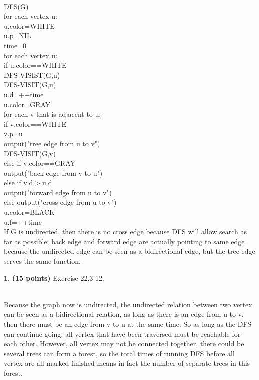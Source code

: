\documentclass[11pt]{article}
\theoremstyle{definition}
\theoremstyle{theorem}
\newtheorem{prob}{}
\newcommand{\solution}{\medskip\noindent{\color{DarkBlue}\textbf{Solution:}}}
\begin{document}
\solution\\
DFS(G)\\
\null\qquad for each vertex u:\\
\null\qquad\qquad u.color=WHITE\\
\null\qquad\qquad u.p=NIL\\
\null\qquad time=0\\
\null\qquad for each vertex u:\\
\null\qquad\qquad if u.color==WHITE\\
\null\qquad\qquad\qquad DFS-VISIST(G,u)\\
DFS-VISIT(G,u)\\
\null\qquad u.d=++time\\
\null\qquad u.color=GRAY\\
\null\qquad for each v that is adjacent to u:\\
\null\qquad\qquad if v.color==WHITE\\
\null\qquad\qquad\qquad v.p=u\\
\null\qquad\qquad\qquad output("tree edge from u to v")\\
\null\qquad\qquad\qquad DFS-VISIT(G,v)\\
\null\qquad\qquad else if v.color==GRAY\\
\null\qquad\qquad\qquad output("back edge from v to u")\\
\null\qquad\qquad else if v.d$>$u.d\\
\null\qquad\qquad\qquad output("forward edge from u to v")\\
\null\qquad\qquad else output("cross edge from u to v")\\
\null\qquad u.color=BLACK\\
\null\qquad u.f=++time\\
If G is undirected, then there is no cross edge because DFS will allow search as far as possible; back edge and forward edge are actually pointing to same edge because the undirected edge can be seen as a bidirectional edge, but the tree edge serves the same function.\\
\begin{prob} \textbf{(15 points)} Exercise 22.3-12.
\end{prob}
\solution\\Because the graph now is undirected, the undirected relation between two vertex can be seen as a bidirectional relation, as long as there is an edge from u to v, then there must be an edge from v to u at the same time. So as long as the DFS can continue going, all vertex that have been traversed must be reachable for each other. However, all vertex may not be connected together, there could be several trees can form a forest, so the total times of running DFS before all vertex are all marked finished means in fact the number of separate trees in this forest.\\
\end{document}
